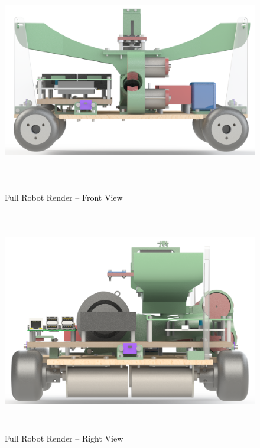 \begin{figure}[H]   %
	\centering \includegraphics[width=6in, height=3.85in, keepaspectratio]{figures/render_front.png}
	\caption{Full Robot Render -- Front View}	\label{fig:render_front}
\end{figure}
\begin{figure}[H]   %
	\centering \includegraphics[width=6in, height=3.85in, keepaspectratio]{figures/render_right.png}
	\caption{Full Robot Render -- Right View}	\label{fig:render_right}
\end{figure}

